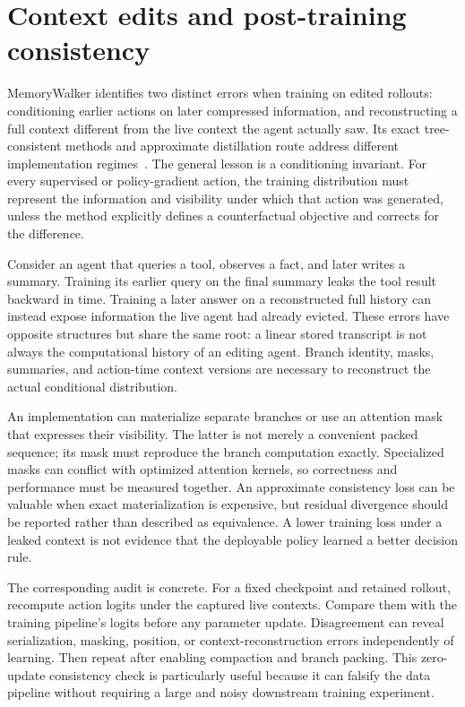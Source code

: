 \section{Context edits and post-training consistency}
\label{sec:C08:consistency}
MemoryWalker identifies two distinct errors when training on edited rollouts: conditioning earlier actions on later compressed information, and reconstructing a full context different from the live context the agent actually saw. Its exact tree-consistent methods and approximate distillation route address different implementation regimes~\cite{j2026memorywalker}. The general lesson is a conditioning invariant. For every supervised or policy-gradient action, the training distribution must represent the information and visibility under which that action was generated, unless the method explicitly defines a counterfactual objective and corrects for the difference.

Consider an agent that queries a tool, observes a fact, and later writes a summary. Training its earlier query on the final summary leaks the tool result backward in time. Training a later answer on a reconstructed full history can instead expose information the live agent had already evicted. These errors have opposite structures but share the same root: a linear stored transcript is not always the computational history of an editing agent. Branch identity, masks, summaries, and action-time context versions are necessary to reconstruct the actual conditional distribution.

An implementation can materialize separate branches or use an attention mask that expresses their visibility. The latter is not merely a convenient packed sequence; its mask must reproduce the branch computation exactly. Specialized masks can conflict with optimized attention kernels, so correctness and performance must be measured together. An approximate consistency loss can be valuable when exact materialization is expensive, but residual divergence should be reported rather than described as equivalence. A lower training loss under a leaked context is not evidence that the deployable policy learned a better decision rule.

The corresponding audit is concrete. For a fixed checkpoint and retained rollout, recompute action logits under the captured live contexts. Compare them with the training pipeline's logits before any parameter update. Disagreement can reveal serialization, masking, position, or context-reconstruction errors independently of learning. Then repeat after enabling compaction and branch packing. This zero-update consistency check is particularly useful because it can falsify the data pipeline without requiring a large and noisy downstream training experiment.

